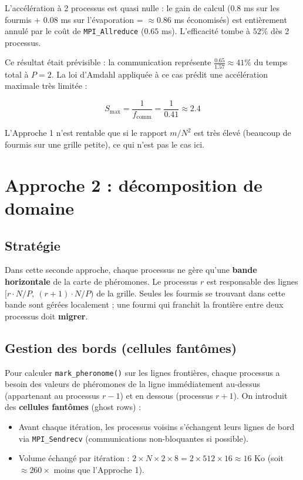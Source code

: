L'accélération à 2 processus est quasi nulle : le gain de calcul ($0.8$ ms sur les
fourmis + $0.08$ ms sur l'évaporation = $\approx 0.86$ ms économisés) est entièrement
annulé par le coût de \texttt{MPI\_Allreduce} ($0.65$ ms). L'efficacité tombe à $52\%$
dès 2 processus.

Ce résultat était prévisible : la communication représente
$\frac{0.65}{1.57} \approx 41\%$ du temps total à $P = 2$. La loi d'Amdahl appliquée
à ce cas prédit une accélération maximale très limitée :

\[
    S_{\max} = \frac{1}{f_{\text{comm}}} = \frac{1}{0.41} \approx 2.4
\]

L'Approche 1 n'est rentable que si le rapport $m / N^2$ est très élevé (beaucoup de
fourmis sur une grille petite), ce qui n'est pas le cas ici.

\section{Approche 2 : décomposition de domaine}

\subsection{Stratégie}

Dans cette seconde approche, chaque processus ne gère qu'une \textbf{bande horizontale}
de la carte de phéromones. Le processus $r$ est responsable des lignes
$[r \cdot N/P,\ (r+1) \cdot N/P)$ de la grille. Seules les fourmis se trouvant
dans cette bande sont gérées localement ; une fourmi qui franchit la frontière entre
deux processus doit \textbf{migrer}.

\subsection{Gestion des bords (cellules fantômes)}

Pour calculer \texttt{mark\_pheronome()} sur les lignes frontières, chaque processus
a besoin des valeurs de phéromones de la ligne immédiatement au-dessus (appartenant au
processus $r-1$) et en dessous (processus $r+1$). On introduit des
\textbf{cellules fantômes} (ghost rows) :

\begin{itemize}
    \item Avant chaque itération, les processus voisins s'échangent leurs lignes de bord
          via \texttt{MPI\_Sendrecv} (communications non-bloquantes si possible).
    \item Volume échangé par itération : $2 \times N \times 2 \times 8 = 2 \times 512 \times 16 \approx 16\text{ Ko}$
          (soit $\approx 260\times$ moins que l'Approche 1).
\end{itemize}

